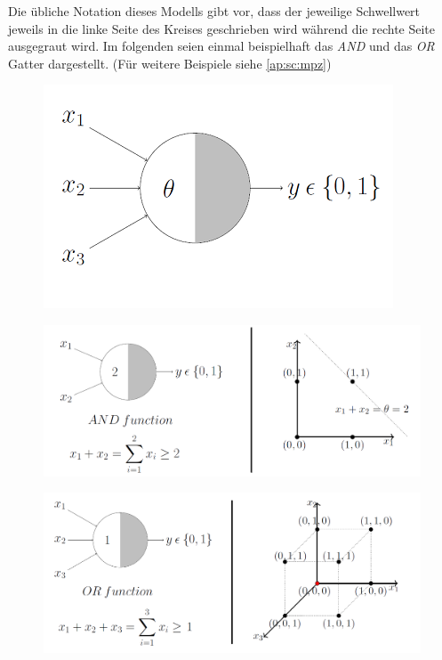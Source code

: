 Die übliche Notation dieses Modells gibt vor, dass der jeweilige Schwellwert jeweils in die linke Seite des Kreises geschrieben wird während die rechte Seite ausgegraut wird. Im folgenden seien einmal beispielhaft das \emph{AND} und das \emph{OR} Gatter dargestellt. (Für weitere Beispiele siehe \autoref{ap:sc:mpz})

\begin{figure}[!htb]
	\centering
	\includegraphics[width=.5\linewidth]{img/aufbau2}
	\label{fig:bioNeuron_notation}
\end{figure}


\begin{figure}[!htb]
	\centering
	\includegraphics[width=\linewidth]{img/mpn_and}
	\label{fig:mpn_and}
\end{figure}

\begin{figure}[!htb]
	\centering
	\includegraphics[width=\linewidth]{img/mpn_or}
	\label{fig:mpn_or}
\end{figure}


